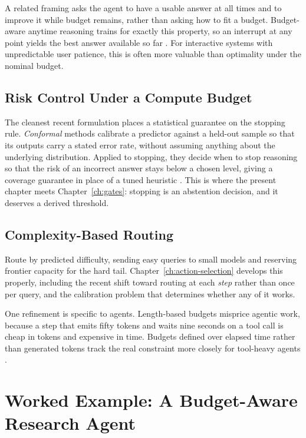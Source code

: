 \documentclass[11pt]{book}
\begin{document}
A related framing asks the agent to have a usable answer at all times and to improve it while budget remains, rather than asking how to fit a budget. Budget-aware anytime reasoning trains for exactly this property, so an interrupt at any point yields the best answer available so far \cite{anytime2026}. For interactive systems with unpredictable user patience, this is often more valuable than optimality under the nominal budget.

\subsection{Risk Control Under a Compute Budget}

The cleanest recent formulation places a statistical guarantee on the stopping rule. \emph{Conformal} methods calibrate a predictor against a held-out sample so that its outputs carry a stated error rate, without assuming anything about the underlying distribution. Applied to stopping, they decide when to stop reasoning so that the risk of an incorrect answer stays below a chosen level, giving a coverage guarantee in place of a tuned heuristic \cite{conformalthinking2026}. This is where the present chapter meets Chapter~\ref{ch:gates}: stopping is an abstention decision, and it deserves a derived threshold.

\subsection{Complexity-Based Routing}

Route by predicted difficulty, sending easy queries to small models and reserving frontier capacity for the hard tail. Chapter~\ref{ch:action-selection} develops this properly, including the recent shift toward routing at each \textit{step} rather than once per query, and the calibration problem that determines whether any of it works.

One refinement is specific to agents. Length-based budgets misprice agentic work, because a step that emits fifty tokens and waits nine seconds on a tool call is cheap in tokens and expensive in time. Budgets defined over elapsed time rather than generated tokens track the real constraint more closely for tool-heavy agents \cite{timelymachine2026}.

\section{Worked Example: A Budget-Aware Research Agent}
\end{document}
